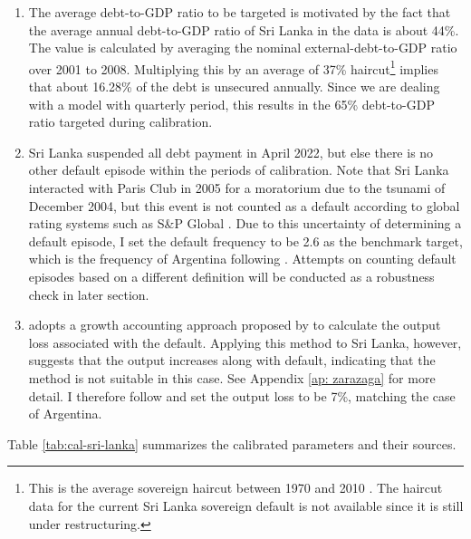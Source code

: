 \begin{enumerate}[label = (\roman*)]
    \item
    The average debt-to-GDP ratio to be targeted is motivated by the fact that the average annual debt-to-GDP ratio of Sri Lanka in the data is about 44\%.
    The value is calculated by averaging the nominal external-debt-to-GDP ratio over 2001 to 2008\footnotemark{}.
    Multiplying this by an average of 37\% haircut\footnote{This is the average sovereign haircut between 1970 and 2010 \citep{Cruces-Trebesch-13}. The haircut data for the current Sri Lanka sovereign default is not available since it is still under restructuring.} implies that about 16.28\% of the debt is unsecured annually\footnotemark{}.
    Since we are dealing with a model with quarterly period, this results in the 65\% debt-to-GDP ratio targeted during calibration.
    \item
    Sri Lanka suspended all debt payment in April 2022, but else there is no other default episode within the periods of calibration. Note that Sri Lanka interacted with Paris Club in 2005 for a moratorium due to the tsunami of December 2004, but this event is not counted as a default according to global rating systems such as S\&P Global \citep{SPGlobal-default-report}.
    Due to this uncertainty of determining a default episode, I set the default frequency to be 2.6 as the benchmark target, which is the frequency of Argentina following \citet{Na-18}. Attempts on counting default episodes based on a different definition will be conducted as a robustness check in later section.
    \item  \citet{Na-18} adopts a growth accounting approach proposed by \citet{zarazaga-12} to calculate the output loss associated with the default. Applying this method to Sri Lanka, however, suggests that the output increases along with default, indicating that the method is not suitable in this case. See Appendix \ref{ap: zarazaga} for more detail. I therefore follow \citet{Na-18} and set the output loss to be 7\%, matching the case of Argentina.
\end{enumerate}
Table \ref{tab:cal-sri-lanka} summarizes the calibrated parameters and their sources.

